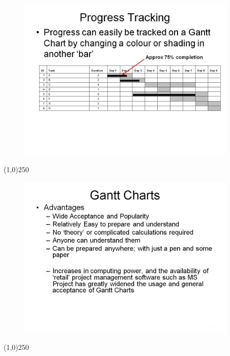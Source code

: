 \begin{frame}
\begin{figure}
	\centering
		\includegraphics[width = 10.5cm]{oldnotes/Slide39.jpg}
\end{figure}
\end{frame}
\begin{center}\line(1,0){250}\end{center}





\begin{frame}
\begin{figure}
	\centering
		\includegraphics[width = 10.5cm]{oldnotes/Slide40.jpg}
\end{figure}
\end{frame}
\begin{center}\line(1,0){250}\end{center}





